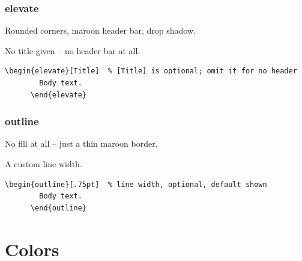 \documentclass{ltx-talk}
\newcommand{\lining}[1]{{\addfontfeature{Numbers=Lining}#1}}
\begin{document}
\begin{frame*}
  \frametitle{elevate}
  \begin{elevate}[Title]
    Rounded corners, maroon header bar, drop shadow.
  \end{elevate}

  \bigskip
  \begin{elevate}
    No title given -- no header bar at all.
  \end{elevate}

  \bigskip
  \begin{sidebar}
    \begin{Verbatim}[gobble=6]
      \begin{elevate}[Title]  % [Title] is optional; omit it for no header
        Body text.
      \end{elevate}
    \end{Verbatim}
  \end{sidebar}
\end{frame*}

\begin{frame*}
  \frametitle{outline}
  \begin{outline}
    No fill at all -- just a thin maroon border.
  \end{outline}

  \bigskip
  \begin{outline}[2pt]
    A custom line width.
  \end{outline}

  \bigskip
  \begin{sidebar}
    \begin{Verbatim}[gobble=6]
      \begin{outline}[.75pt]  % line width, optional, default shown
        Body text.
      \end{outline}
    \end{Verbatim}
  \end{sidebar}
\end{frame*}

\section{Colors}

\newcommand{\swatch}[2]{%
  \begin{minipage}[t]{3.2cm}
    {\fboxsep=0pt \colorbox{#1}{\rule{0pt}{1.2cm}\rule{3.2cm}{0pt}}}
    \\[2pt]
    \small #1\par
    \lining{#2}
  \end{minipage}%
}
\end{document}

